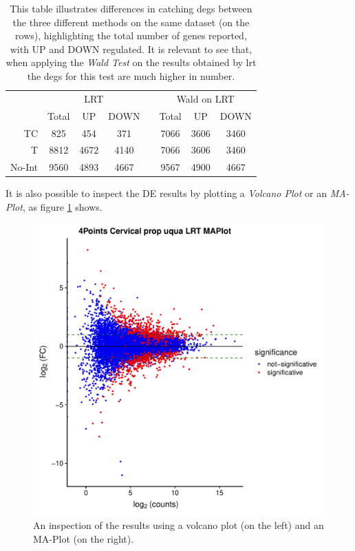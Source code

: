 \begin{table}[H]
\centering
\begin{tabular}{r c c c c c c c}
\multicolumn{1}{r}{} & \multicolumn{3}{c}{LRT} && \multicolumn{3}{c}{Wald on LRT} \\
\multicolumn{1}{r}{} & Total & UP & DOWN && Total & UP & DOWN \\
\cline{2-4}\cline{6-8}
TC & 825 & 454 & 371 && 7066 & 3606 & 3460 \\
T & 8812 & 4672 & 4140 && 7066 & 3606 & 3460 \\
No-Int & 9560 & 4893 & 4667 && 9567 & 4900 & 4667 \\
\end{tabular}
\caption[\gls{tic} DE methods results]{This table illustrates differences in catching \glspl{deg} between the three different methods on the same dataset (on the rows), highlighting the total number of genes reported, with UP and DOWN regulated. 
It is relevant to see that, when applying the \textit{Wald Test} on the results obtained by \gls{lrt} the \glspl{deg} for this test are much higher in number.}
\label{tab:ticorserderesults}
\end{table}


It is also possible to inspect the DE results by plotting a \textit{Volcano Plot} or an \textit{MA-Plot}, as figure \ref{fig:ticorservolcma} shows.

\begin{figure}[H]
\includegraphics[width=\textwidth, keepaspectratio]{img/ticorser/de/volcma.pdf}
\caption[ticorser Volcano-MA plots]{An inspection of the results using a volcano plot (on the left) and an MA-Plot (on the right).}
\label{fig:ticorservolcma}
\centering
\end{figure}

